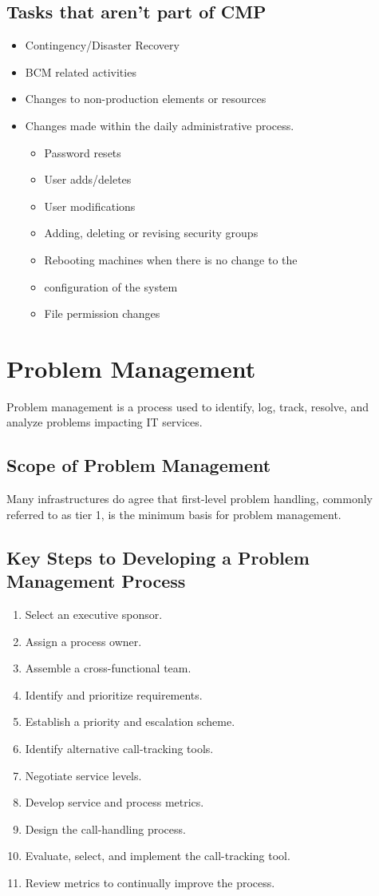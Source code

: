 \documentclass[8pt,a4]{extarticle}
\begin{document}
\begin{multicols}{3}
\subsection{Tasks that aren't part of CMP}
\begin{itemize}
\item Contingency/Disaster Recovery
\item BCM related activities
\item Changes to non-production elements or resources
\item Changes made within the daily administrative process.
\begin{itemize}
\item Password resets
\item User adds/deletes
\item User modifications
\item Adding, deleting or revising security groups
\item Rebooting machines when there is no change to the
\item configuration of the system
\item File permission changes
\end{itemize}
\end{itemize}

\section{Problem Management}
Problem management is a process used to identify, log, track, resolve, and analyze problems impacting IT services.

\subsection{Scope of Problem Management}
Many infrastructures do agree that first-level problem handling, commonly referred to as tier 1,
 is the minimum basis for problem management.

\subsection{Key Steps to Developing a Problem Management Process}
\begin{enumerate}
\item Select an executive sponsor.
\item Assign a process owner.
\item Assemble a cross-functional team.
\item Identify and prioritize requirements.
\item Establish a priority and escalation scheme.
\item Identify alternative call-tracking tools.
\item Negotiate service levels.
\item Develop service and process metrics.
\item Design the call-handling process.
\item Evaluate, select, and implement the call-tracking tool.
\item Review metrics to continually improve the process.
\end{enumerate}


\end{multicols}
\end{document}
